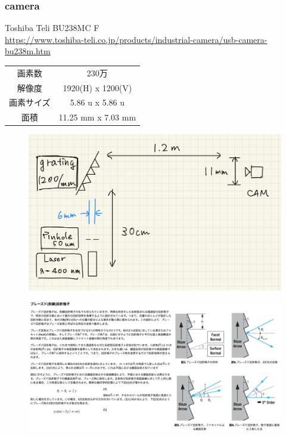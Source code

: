\documentclass[a4paper,11pt,uplatex]{jsarticle}
\begin{document}
\subsubsection*{camera}
Toshiba Teli BU238MC F\\
\url{https://www.toshiba-teli.co.jp/products/industrial-camera/usb-camera-bu238m.htm}
\begin{table}[h]
\centering
\begin{tabular}{c|c}
  画素数 & 230万\\
  解像度 & 1920(H) x 1200(V)\\
  画素サイズ & 5.86 u x 5.86 u\\
  面積 & 11.25 mm x 7.03 mm 
\end{tabular}
\end{table}
\begin{figure}[tb]
  \centering
  \includegraphics[width=0.8\linewidth]{image/SE-1.jpeg}\\
  \caption{}
  \label{}
\end{figure}
\begin{figure}[tb]
  \centering
  \includegraphics[width=0.8\linewidth]{image/SE-2.png}\\
  \caption{}
  \label{}
\end{figure}
\end{document}
